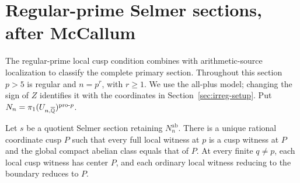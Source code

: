 \section{Regular-prime Selmer sections, after McCallum}
\label{sec:regular-prime-sections}

The regular-prime local cusp condition combines with arithmetic-source
localization to classify the complete primary section. Throughout
this section \(p>5\) is regular and \(n=p^r\), with \(r\ge1\).
We use the all-plus model; changing the sign of \(Z\) identifies it
with the coordinates in Section~\ref{sec:irreg-setup}. Put
\(N_n=\pi_1(U_{n,\overline{\mathbb Q}})^{\mathrm{pro}\text{-}p}\).

\begin{lemma}
\label{lem:all-regular-compact-boundary}
Let $s$ be a quotient Selmer section retaining $N_n^{\mathrm{ab}}$.
There is a unique rational coordinate cusp $P$ such that every
full local witness at $p$ is a cusp witness at $P$ and the global
compact abelian class equals that of $P$. At every finite $q\ne p$,
each local cusp witness has center $P$, and each ordinary local
witness reducing to the boundary reduces to $P$.
\end{lemma}
